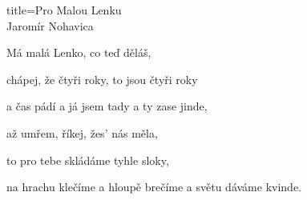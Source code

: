 \begin{song}{title=\predtitle\centering Pro Malou Lenku \\\large Jaromír Nohavica  \vspace*{-0.3cm}}
\begin{centerjustified}

\end{centerjustified}
\newpage
\begin{centerjustified}


\sloka
Má malá Lenko, co teď děláš,

chápej, že čtyři roky, to jsou čtyři roky

a čas pádí a já jsem tady a ty zase jinde,

až umřem, říkej, žes' nás měla,

to pro tebe skládáme tyhle sloky,

na hrachu klečíme a hloupě brečíme a světu dáváme kvinde.

\end{centerjustified}
\setcounter{Slokočet}{0}
\end{song}
